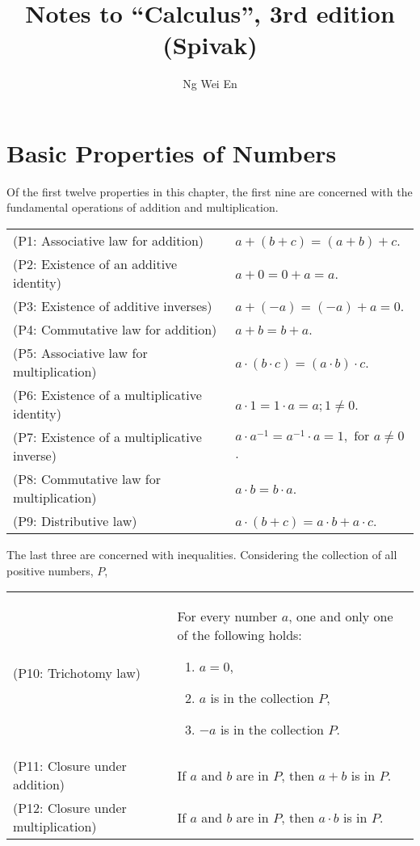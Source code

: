 \documentclass{article}
\title{Notes to ``Calculus'', 3rd edition (Spivak)}
\author{Ng Wei En}
\numberwithin{corollary}{subsection}
\numberwithin{definition}{subsection}
\numberwithin{lemma}{subsection}
\numberwithin{theorem}{subsection}
\begin{document}
\maketitle
\tableofcontents
\newpage

\section{Basic Properties of Numbers}

Of the first twelve properties in this chapter, the first nine are concerned
with the fundamental operations of addition and multiplication.

\begin{tabular}{l p{1.5in}}
  (P1: Associative law for addition) & $a + (b + c) = (a + b) + c$. \\
  (P2: Existence of an additive identity) & $a + 0 = 0 + a = a$. \\
  (P3: Existence of additive inverses) & $a + (-a) = (-a) + a = 0$. \\
  (P4: Commutative law for addition) & $a + b = b + a$. \\
  (P5: Associative law for multiplication) & $a \cdot (b \cdot c) = (a \cdot
    b) \cdot c$. \\
  (P6: Existence of a multiplicative identity) & $a \cdot 1 = 1 \cdot a = a; 1
    \neq 0$. \\
  (P7: Existence of a multiplicative inverse) & $a \cdot a^{-1} = a^{-1} \cdot
    a = 1, \text{ for } a \neq 0$. \\
  (P8: Commutative law for multiplication) & $a \cdot b = b \cdot a$. \\
  (P9: Distributive law) & $a \cdot (b + c) = a \cdot b + a \cdot c$.
\end{tabular}

The last three are concerned with inequalities. Considering the collection of
all positive numbers, $P$,

\begin{tabular}{l p{2in}}
  (P10: Trichotomy law) & For every number $a$, one and only one of the
    following holds:
    \begin{enumerate}
      \itemsep0em
      \item $a = 0$,
      \item $a$ is in the collection $P$,
      \item $-a$ is in the collection $P$.
    \end{enumerate} \\
  (P11: Closure under addition) & If $a$ and $b$ are in $P$, then $a + b$ is
    in $P$. \\
  (P12: Closure under multiplication) & If $a$ and $b$ are in $P$, then $a
    \cdot b$ is in $P$.
\end{tabular}
\end{document}
